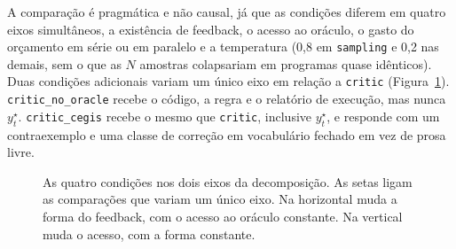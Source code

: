 \documentclass[letterpaper]{article} %
\begin{document}
A comparação é pragmática e não causal, já que as condições diferem em quatro
eixos simultâneos, a existência de feedback, o acesso ao oráculo, o gasto do
orçamento em série ou em paralelo e a temperatura (0,8 em \texttt{sampling} e 0,2
nas demais, sem o que as $N$ amostras colapsariam em programas quase idênticos).
Duas condições adicionais variam um único eixo em relação a \texttt{critic}
(Figura~\ref{fig:matriz}). \texttt{critic\_no\_oracle} recebe o código, a regra e
o relatório de execução, mas nunca $y^\star_t$. \texttt{critic\_cegis} recebe o
mesmo que \texttt{critic}, inclusive $y^\star_t$, e responde com um contraexemplo
e uma classe de correção em vocabulário fechado em vez de prosa livre.

\begin{figure}[t]
\centering
{}
\caption{As quatro condições nos dois eixos da decomposição. As setas ligam as
comparações que variam um único eixo. Na horizontal muda a forma do feedback,
com o acesso ao oráculo constante. Na vertical muda o acesso, com a forma
constante.}
\label{fig:matriz}
\end{figure}
\end{document}
